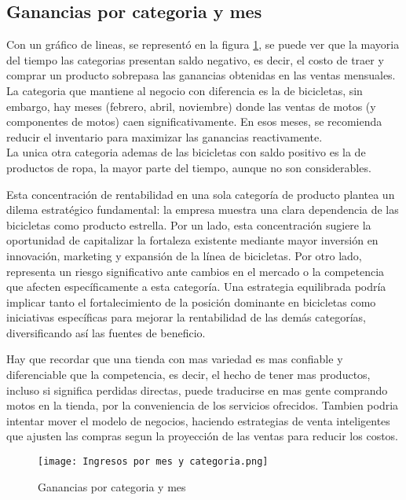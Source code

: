 \documentclass{article}
\begin{document}
\subsection{Ganancias por categoria y mes}
Con un gráfico de lineas, se representó en la figura \ref{fig:Ganancias por categoria y mes}, se puede ver que la mayoria del tiempo las categorias presentan saldo negativo, es decir, el costo de traer y comprar un producto sobrepasa las ganancias obtenidas en las ventas mensuales.\\
La categoria que mantiene al negocio con diferencia es la de bicicletas, sin embargo, hay meses (febrero, abril, noviembre) donde las ventas de motos (y componentes de motos) caen significativamente. En esos meses, se recomienda reducir el inventario para maximizar las ganancias reactivamente.\\
La unica otra categoria ademas de las bicicletas con saldo positivo es la de productos de ropa, la mayor parte del tiempo, aunque no son considerables.

Esta concentración de rentabilidad en una sola categoría de producto plantea un dilema estratégico fundamental: la empresa muestra una clara dependencia de las bicicletas como producto estrella. Por un lado, esta concentración sugiere la oportunidad de capitalizar la fortaleza existente mediante mayor inversión en innovación, marketing y expansión de la línea de bicicletas. Por otro lado, representa un riesgo significativo ante cambios en el mercado o la competencia que afecten específicamente a esta categoría. Una estrategia equilibrada podría implicar tanto el fortalecimiento de la posición dominante en bicicletas como iniciativas específicas para mejorar la rentabilidad de las demás categorías, diversificando así las fuentes de beneficio.

Hay que recordar que una tienda con mas variedad es mas confiable y diferenciable que la competencia, es decir, el hecho de tener mas productos, incluso si significa perdidas directas, puede traducirse en mas gente comprando motos en la tienda, por la conveniencia de los servicios ofrecidos.
Tambien podria intentar mover el modelo de negocios, haciendo estrategias de venta inteligentes que ajusten las compras segun la proyección de las ventas para reducir los costos.

\begin{figure}
    \centering
    \texttt{[image: Ingresos por mes y categoria.png]}
    \caption{Ganancias por categoria y mes}
    \label{fig:Ganancias por categoria y mes}
\end{figure}
\end{document}
